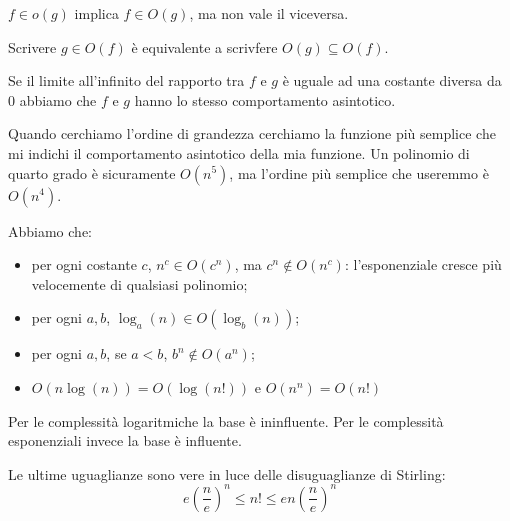 $f \in o(g)$ implica $f \in O(g)$, ma non vale il viceversa.

Scrivere $g \in O(f)$ è equivalente a scrivfere $O(g) \subseteq O(f)$.

Se il limite all'infinito del rapporto tra $f$ e $g$ è uguale ad una costante diversa da 0 abbiamo che
$f$ e $g$ hanno lo stesso comportamento asintotico.

Quando cerchiamo l'ordine di grandezza cerchiamo la funzione più semplice che mi indichi il
comportamento asintotico della mia funzione. Un polinomio di quarto grado è sicuramente $O(n^{5})$,
ma l'ordine più semplice che useremmo è $O(n^{4})$.

Abbiamo che:
\begin{itemize}
    \item per ogni costante $c$, $n^{c} \in O(c^{n})$, ma $c^{n} \notin O(n^{c})$: l'esponenziale
    cresce più velocemente di qualsiasi polinomio;
    \item per ogni $a,b$, $\log_{a}(n) \in O(\log_{b}(n))$;
    \item per ogni $a,b$, se $a < b$, $b^{n} \notin O(a^{n})$;
    \item $O(n \log(n)) = O(\log(n!))$ e $O(n^{n}) = O(n!)$ 
\end{itemize}

Per le complessità logaritmiche la base è ininfluente. Per le complessità esponenziali invece la
base è influente.

Le ultime uguaglianze sono vere in luce delle disuguaglianze di Stirling:
\begin{equation*}
    e\left(\frac{n}{e}\right)^{n} \leq n! \leq e n \left(\frac{n}{e}\right)^{n}
\end{equation*}

